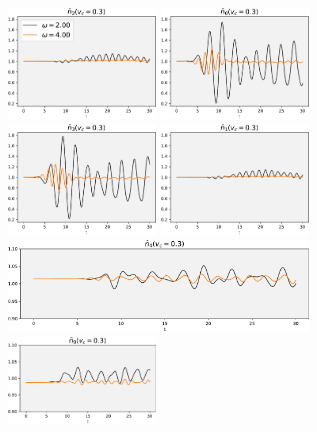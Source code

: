\begin{figure}[!hbt]
    \centering
    \includegraphics[width=0.35\textwidth]{graph/occupation/occupation_site_2_vc_03.pdf}
    \includegraphics[width=0.35\textwidth]{graph/occupation/occupation_site_0_vc_03.pdf}
    \includegraphics[width=0.35\textwidth]{graph/occupation/occupation_site_3_vc_03.pdf}
    \includegraphics[width=0.35\textwidth]{graph/occupation/occupation_site_1_vc_03.pdf}
    \includegraphics[width=0.71\textwidth]{graph/occupation/occupation_site_4_vc_03.pdf}
    \includegraphics[width=0.35\textwidth]{graph/occupation/occupation_site_9_vc_03.pdf}

\end{figure}
